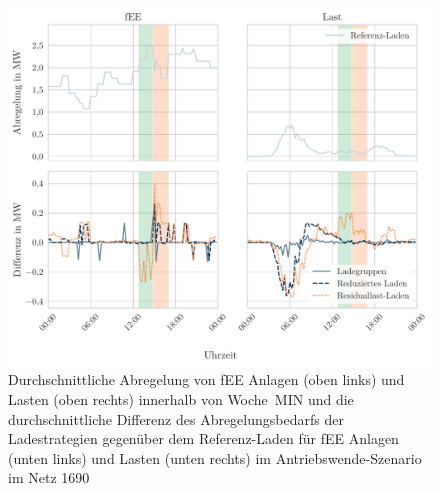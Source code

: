 \begin{figure}[H]
    \centering
    \includegraphics[width=\textwidth]{Bilder/1690_fEE_load_diff}
    \caption{Durchschnittliche Abregelung von fEE Anlagen (oben links) und Lasten (oben rechts) innerhalb von Woche~MIN und die durchschnittliche Differenz des Abregelungsbedarfs der Ladestrategien gegenüber dem Referenz-Laden für fEE Anlagen (unten links) und Lasten (unten rechts) im Antriebswende-Szenario im Netz \num{1690}}\label{fig:1690_fEE_load_diff}
\end{figure}